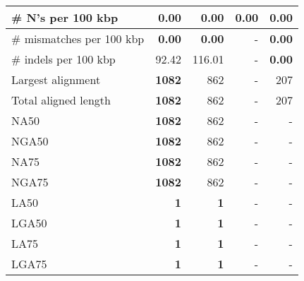 \documentclass[12pt,a4paper]{article}
\begin{document}
\begin{table}[ht]
\begin{center}
\begin{tabular}{|l*{4}{|r}|}
\# N's per 100 kbp & 0.00 & 0.00 & 0.00 & 0.00 \\ \hline
\# mismatches per 100 kbp & {\bf 0.00} & {\bf 0.00} & - & {\bf 0.00} \\ \hline
\# indels per 100 kbp & 92.42 & 116.01 & - & {\bf 0.00} \\ \hline
Largest alignment & {\bf 1082} & 862 & - & 207 \\ \hline
Total aligned length & {\bf 1082} & 862 & - & 207 \\ \hline
NA50 & {\bf 1082} & 862 & - & - \\ \hline
NGA50 & {\bf 1082} & 862 & - & - \\ \hline
NA75 & {\bf 1082} & 862 & - & - \\ \hline
NGA75 & {\bf 1082} & 862 & - & - \\ \hline
LA50 & {\bf 1} & {\bf 1} & - & - \\ \hline
LGA50 & {\bf 1} & {\bf 1} & - & - \\ \hline
LA75 & {\bf 1} & {\bf 1} & - & - \\ \hline
LGA75 & {\bf 1} & {\bf 1} & - & - \\ \hline
\end{tabular}
\end{center}
\end{table}
\end{document}
